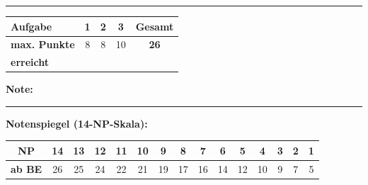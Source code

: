 \documentclass[11pt, a4paper]{article}
\newcommand{\luecke}[1]{\rule{#1}{0.4pt}}
\begin{document}
\vspace{25pt}
\hrule
\vspace{10pt}

\noindent
\begin{tabularx}{\textwidth}{|X|c|c|c||c|}
\hline
\textbf{Aufgabe} & 1 & 2 & 3 & \textbf{Gesamt} \\
\hline
\textbf{max. Punkte} & 8 & 8 & 10 & \textbf{26} \\
\hline
\textbf{erreicht} & & & & \\[0.8em]
\hline
\end{tabularx}

\vspace{10pt}

\begin{flushright}
\textbf{Note:} \luecke{2cm}
\end{flushright}

\vspace{1em}

\textbf{Notenspiegel (14-NP-Skala):}

\begin{center}
\footnotesize
\begin{tabular}{|c|c|c|c|c|c|c|c|c|c|c|c|c|c|c|}
\hline
\textbf{NP} & 14 & 13 & 12 & 11 & 10 & 9 & 8 & 7 & 6 & 5 & 4 & 3 & 2 & 1 \\
\hline
\textbf{ab BE} & 26 & 25 & 24 & 22 & 21 & 19 & 17 & 16 & 14 & 12 & 10 & 9 & 7 & 5 \\
\hline
\end{tabular}
\end{center}
\end{document}
